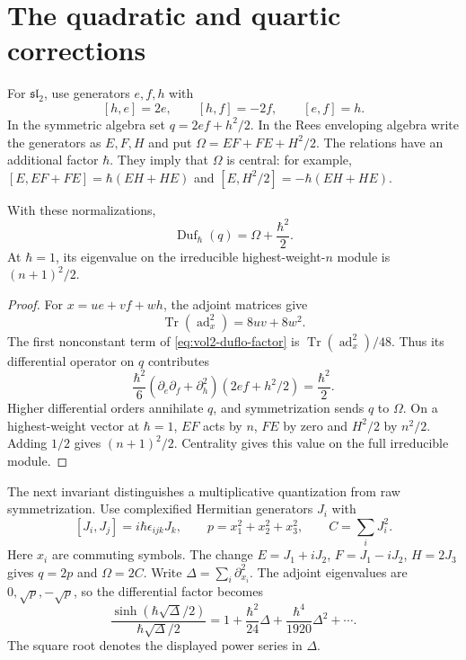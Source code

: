\section{The quadratic and quartic corrections}
\label{sec:vol2-quadratic-quartic-wheels}

For $\mathfrak{sl}_2$, use generators $e,f,h$ with
\[
 [h,e]=2e,\qquad [h,f]=-2f,\qquad [e,f]=h.
\]
In the symmetric algebra set $q=2ef+h^2/2$.
In the Rees enveloping algebra write the generators
as $E,F,H$ and put
$\Omega=EF+FE+H^2/2$.
The relations have an additional factor $\hbar$.
They imply that $\Omega$ is central:
for example,
$[E,EF+FE]=\hbar(EH+HE)$ and
$[E,H^2/2]=-\hbar(EH+HE)$.

\begin{proposition}\label{prop:vol2-duflo-quadratic}
With these normalizations,
\[
 \operatorname{Duf}_\hbar(q)=\Omega+\frac{\hbar^2}{2}.
\]
At $\hbar=1$, its eigenvalue on the irreducible
highest-weight-$n$ module is $(n+1)^2/2$.
\end{proposition}
\begin{proof}
For $x=ue+vf+wh$, the adjoint matrices give
\[
 \operatorname{Tr}(\operatorname{ad}_x^2)=8uv+8w^2.
\]
The first nonconstant term of
\eqref{eq:vol2-duflo-factor} is
$\operatorname{Tr}(\operatorname{ad}_x^2)/48$.
Thus its differential operator on $q$ contributes
\[
 \frac{\hbar^2}{6}
       (\partial_e\partial_f+\partial_h^2)
       (2ef+h^2/2)=\frac{\hbar^2}{2}.
\]
Higher differential orders annihilate $q$, and
symmetrization sends $q$ to $\Omega$.
On a highest-weight vector at $\hbar=1$, $EF$ acts
by $n$, $FE$ by zero and $H^2/2$ by $n^2/2$.
Adding $1/2$ gives $(n+1)^2/2$.
Centrality gives this value on the full irreducible module.
\end{proof}

The next invariant distinguishes a multiplicative
quantization from raw symmetrization.
Use complexified Hermitian generators $J_i$ with
\[
 [J_i,J_j]=i\hbar\epsilon_{ijk}J_k,
 \qquad
 p=x_1^2+x_2^2+x_3^2,\qquad C=\sum_iJ_i^2.
\]
Here $x_i$ are commuting symbols.
The change
$E=J_1+iJ_2$, $F=J_1-iJ_2$, $H=2J_3$
gives $q=2p$ and $\Omega=2C$.
Write $\Delta=\sum_i\partial_{x_i}^2$.
The adjoint eigenvalues are $0,\sqrt p,-\sqrt p$,
so the differential factor becomes
\[
 \frac{\sinh(\hbar\sqrt\Delta/2)}
      {\hbar\sqrt\Delta/2}
 =1+\frac{\hbar^2}{24}\Delta
     +\frac{\hbar^4}{1920}\Delta^2+\cdots.
\]
The square root denotes the displayed power series
in $\Delta$.

